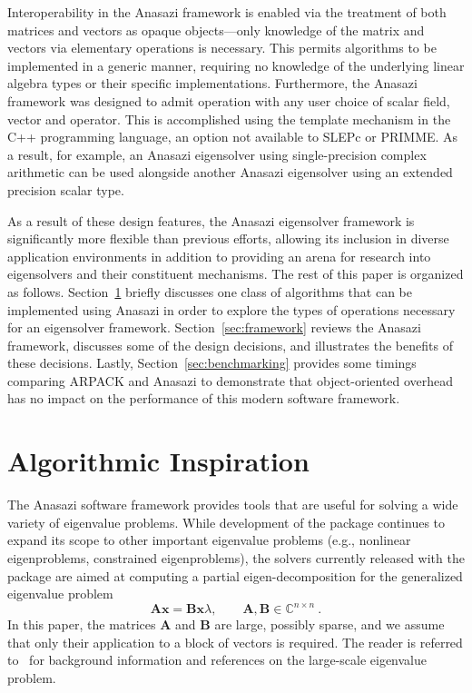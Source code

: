 \documentclass[acmtoms]{acmtrans2m}
\newcounter{algorithm}
\begin{document}
Interoperability in the Anasazi framework is enabled via the treatment of both matrices
and vectors as opaque objects---only knowledge of the matrix and vectors via elementary
operations is necessary. This permits algorithms to be implemented in a generic manner,
requiring no knowledge of the underlying linear algebra types or their specific
implementations.  Furthermore, the Anasazi framework was designed to admit operation with
any user choice of scalar field, vector and operator. This is accomplished using the
template mechanism in the C++ programming language, an option not available to SLEPc or
PRIMME. As a result, for example, an Anasazi eigensolver using single-precision complex
arithmetic can be used alongside another Anasazi eigensolver using an extended precision
scalar type. 

As a result of these design features, the Anasazi eigensolver framework is significantly
more flexible than previous efforts, allowing its inclusion in diverse application
environments in addition to providing an arena for research into eigensolvers and their
constituent mechanisms.  The rest of this paper is organized as follows.
Section~\ref{sec:algorithm-overview} briefly discusses one class of algorithms that can be
implemented using Anasazi in order to explore the types of operations necessary for an
eigensolver framework.  Section~\ref{sec:framework} reviews the Anasazi framework,
discusses some of the design decisions, and illustrates the benefits of these decisions.
Lastly, Section~\ref{sec:benchmarking} provides some timings comparing ARPACK and Anasazi
to demonstrate that object-oriented overhead has no impact on the performance of this
modern software framework.


\section{Algorithmic Inspiration}
\label{sec:algorithm-overview}

The Anasazi software framework provides tools that are useful for solving a wide variety
of eigenvalue problems. While development of the package continues to expand its scope to
other important eigenvalue problems (e.g., nonlinear eigenproblems, constrained
eigenproblems), the solvers currently released with the package are aimed at computing a
partial eigen-decomposition for the generalized eigenvalue problem
\begin{equation}  \label{eq:intro.1}
  \mathbf{A} \mathbf{x} = \mathbf{B} \mathbf{x} \lambda , \qquad
  \mathbf{A}, \mathbf{B} \in \mathbb{C}^{n\times n}\ .
\end{equation}
In this paper, the matrices $\mathbf{A}$ and $\mathbf{B}$ are large, possibly sparse, and
we assume that only their application to a block of vectors is required. The reader is
referred to~\cite{saad:92,sore:02,stew:01book,vors:02} for background information and
references on the large-scale eigenvalue problem.
\end{document}
